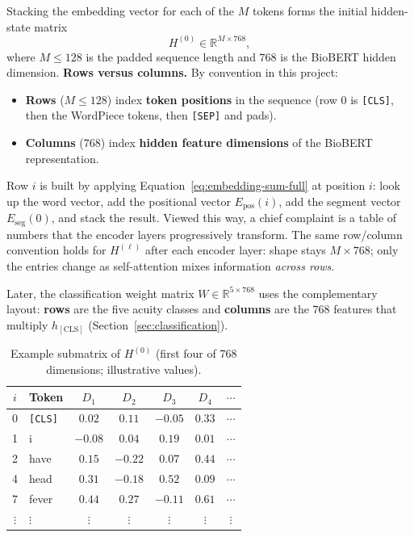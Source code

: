 Stacking the embedding vector for each of the \(M\) tokens forms the initial hidden-state matrix
\begin{equation}
  H^{(0)} \in \mathbb{R}^{M \times 768},
\end{equation}
where \(M \leq 128\) is the padded sequence length and \(768\) is the BioBERT hidden dimension.
\textbf{Rows versus columns.} By convention in this project:
\begin{itemize}
\item \textbf{Rows} (\(M \leq 128\)) index \textbf{token positions} in the sequence (row \(0\) is \texttt{[CLS]}, then the WordPiece tokens, then \texttt{[SEP]} and pads).
\item \textbf{Columns} (\(768\)) index \textbf{hidden feature dimensions} of the BioBERT representation.
\end{itemize}
Row \(i\) is built by applying Equation~\eqref{eq:embedding-sum-full} at position \(i\): look up the word vector, add the positional vector \(E_{\mathrm{pos}}(i)\), add the segment vector \(E_{\mathrm{seg}}(0)\), and stack the result. Viewed this way, a chief complaint is a table of numbers that the encoder layers progressively transform. The same row/column convention holds for \(H^{(\ell)}\) after each encoder layer: shape stays \(M \times 768\); only the entries change as self-attention mixes information \emph{across rows}.

Later, the classification weight matrix \(W \in \mathbb{R}^{5 \times 768}\) uses the complementary layout: \textbf{rows} are the five acuity classes and \textbf{columns} are the \(768\) features that multiply \(h_{\mathrm{[CLS]}}\) (Section~\ref{sec:classification}).

\begin{table}[H]
\centering
\footnotesize
\begin{tabular}{|c|l|c|c|c|c|c|}
\hline
\textbf{\(i\)} & \textbf{Token} & \(D_1\) & \(D_2\) & \(D_3\) & \(D_4\) & \(\cdots\) \\
\hline
0 & \texttt{[CLS]} & \(0.02\) & \(0.11\) & \(-0.05\) & \(0.33\) & \(\cdots\) \\
1 & i & \(-0.08\) & \(0.04\) & \(0.19\) & \(0.01\) & \(\cdots\) \\
2 & have & \(0.15\) & \(-0.22\) & \(0.07\) & \(0.44\) & \(\cdots\) \\
4 & head & \(0.31\) & \(-0.18\) & \(0.52\) & \(0.09\) & \(\cdots\) \\
7 & fever & \(0.44\) & \(0.27\) & \(-0.11\) & \(0.61\) & \(\cdots\) \\
\(\vdots\) & \(\vdots\) & \(\vdots\) & \(\vdots\) & \(\vdots\) & \(\vdots\) & \(\vdots\) \\
\hline
\end{tabular}
\caption{Example submatrix of \(H^{(0)}\) (first four of 768 dimensions; illustrative values).}
\label{tab:submatrix}
\end{table}

